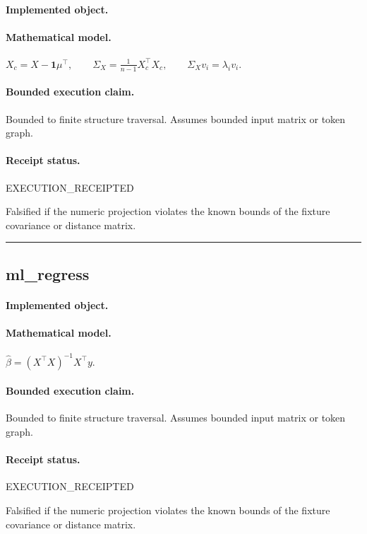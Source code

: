 \paragraph{Implemented object.} 
\paragraph{Mathematical model.} $X_c=X-\mathbf{1}\mu^\top, \qquad \Sigma_X=\frac{1}{n-1}X_c^\top X_c, \qquad \Sigma_X v_i=\lambda_i v_i.$
\paragraph{Bounded execution claim.} Bounded to finite structure traversal. Assumes bounded input matrix or token graph.
\paragraph{Receipt status.} EXECUTION\_RECEIPTED
\begin{falsifier}
Falsified if the numeric projection violates the known bounds of the fixture covariance or distance matrix.
\end{falsifier}

\vspace{1em}\hrule\vspace{1em}
\subsection{ml\_regress}
\paragraph{Implemented object.} 
\paragraph{Mathematical model.} $\hat{\beta} = (X^\top X)^{-1}X^\top y.$
\paragraph{Bounded execution claim.} Bounded to finite structure traversal. Assumes bounded input matrix or token graph.
\paragraph{Receipt status.} EXECUTION\_RECEIPTED
\begin{falsifier}
Falsified if the numeric projection violates the known bounds of the fixture covariance or distance matrix.
\end{falsifier}

